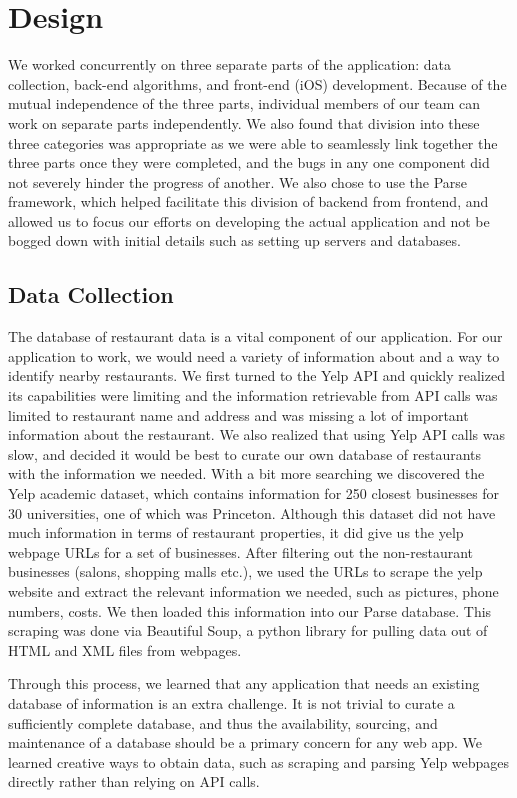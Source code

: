 \documentclass[12pt]{article}
\begin{document}
\section{Design}
We worked concurrently on three separate parts of the application: data collection, back-end algorithms, and front-end (iOS) development. Because of the mutual independence of the three parts, individual members of our team can work on separate parts independently. We also found that division into these three categories was appropriate as we were able to seamlessly link together the three parts once they were completed, and the bugs in any one component did not severely hinder the progress of another. We also chose to use the Parse framework, which helped facilitate this division of backend from frontend, and allowed us to focus our efforts on developing the actual application and not be bogged down with initial details such as setting up servers and databases.  

\subsection{Data Collection}
The database of restaurant data is a vital component of our application. For our application to work, we would need a variety of information about and a way to identify nearby restaurants. We first turned to the Yelp API and quickly realized its capabilities were limiting and the information retrievable from API calls was limited to restaurant name and address and was missing a lot of important information about the restaurant. We also realized that using Yelp API calls was slow, and decided it would be best to curate our own database of restaurants with the information we needed. With a bit more searching we discovered the Yelp academic dataset, which contains information for 250 closest businesses for 30 universities, one of which was Princeton. Although this dataset did not have much information in terms of restaurant properties, it did give us the yelp webpage URLs for a set of businesses. After filtering out the non-restaurant businesses (salons, shopping malls etc.), we used the URLs to scrape the yelp website and extract the relevant information we needed, such as pictures, phone numbers, costs. We then loaded this information into our Parse database. This scraping was done via Beautiful Soup, a python library for pulling data out of HTML and XML files from webpages.

Through this process, we learned that any application that needs an existing database of information is an extra challenge. It is not trivial to curate a sufficiently complete database, and thus the availability, sourcing, and maintenance of a database should be a primary concern for any web app. We learned creative ways to obtain data, such as scraping and parsing Yelp webpages directly rather than relying on API calls.
 
\end{document}
